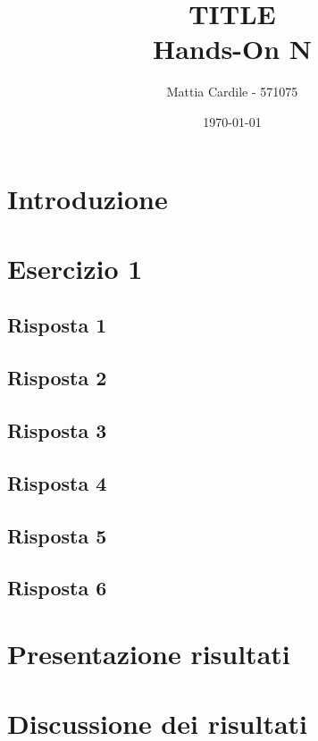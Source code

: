 \documentclass{article}
\title{TITLE \\ Hands-On N}
\author{Mattia Cardile - 571075}
\date{\today}
\begin{document}
\maketitle
\tableofcontents
\newpage
\section{Introduzione}

\section{Esercizio 1}
\subsection{Risposta 1}
\subsection{Risposta 2}
\subsection{Risposta 3}
\subsection{Risposta 4}
\subsection{Risposta 5}
\subsection{Risposta 6}

\section{Presentazione risultati}

\section{Discussione dei risultati}
\end{document}
